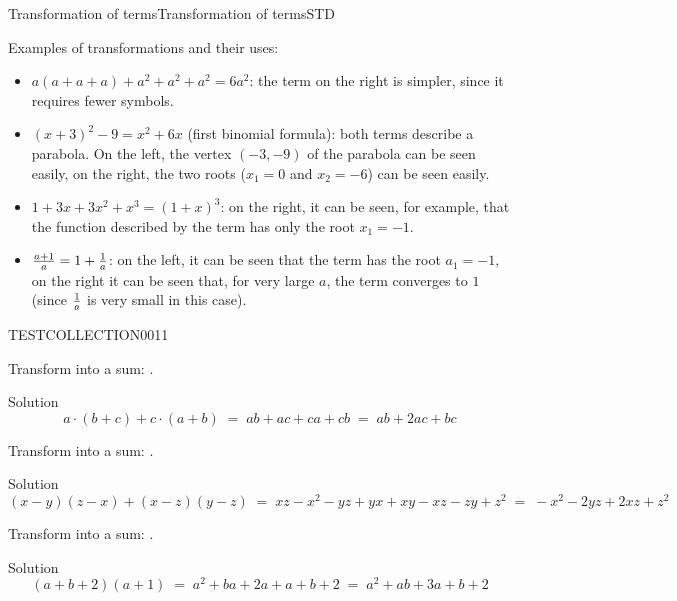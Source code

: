 \begin{MXContent}{Transformation of terms}{Transformation of terms}{STD}
\begin{MExample}
Examples of transformations and their uses:
\begin{itemize}
\item{$a(a+a+a)+a^2+a^2+a^2 = 6a^2$: the term on the right is simpler, since it requires fewer symbols.}
\item{$(x+3)^2-9=x^2+6x$ (first binomial formula): both terms describe a parabola. On the left, 
the vertex $(-3,-9)$ of the parabola can be seen easily, on the right, the two roots ($x_1=0$ and $x_2=-6$)
can be seen easily.}
\item{$1+3x+3x^2+x^3=(1+x)^3$: on the right, it can be seen, for example, that the function described by the 
term has only the root $x_1=-1$.}
\item{$\tfrac{a+1}{a}=1+\tfrac{1}{a}$: on the left, it can be seen that the term has the root $a_1=-1$, 
on the right it can be seen that, for very large $a$, the term converges to $1$ (since $\tfrac{1}{a}$ is very 
small in this case).}
\end{itemize}
\end{MExample}


\begin{MExerciseCollection}{TESTCOLLECTION001}{1}

\begin{MExercise}
Transform into a sum: .
\begin{MHint}{Solution}
$$
a\cdot(b+c)+c\cdot(a+b) \;=\; a b + a c + c a + c b \;=\; a b + 2 a c + b c
$$
\end{MHint}
\end{MExercise}
\newpage

\begin{MExercise}
Transform into a sum: .
\begin{MHint}{Solution}
$$
(x-y)(z-x)+(x-z)(y-z) \;=\; x z - x^2 -y z +y x + x y - x z - z y + z^2 \;=\; -x^2 - 2 y z + 2 x z + z^2
$$
\end{MHint}
\end{MExercise}

\begin{MExercise}
Transform into a sum: .
\begin{MHint}{Solution}
$$
(a+b+2)(a+1) \;=\; a^2 + b a + 2a + a + b + 2 \;=\; a^2 + a b + 3a + b +2
$$
\end{MHint}
\end{MExercise}

\end{MExerciseCollection}




\end{MXContent}


